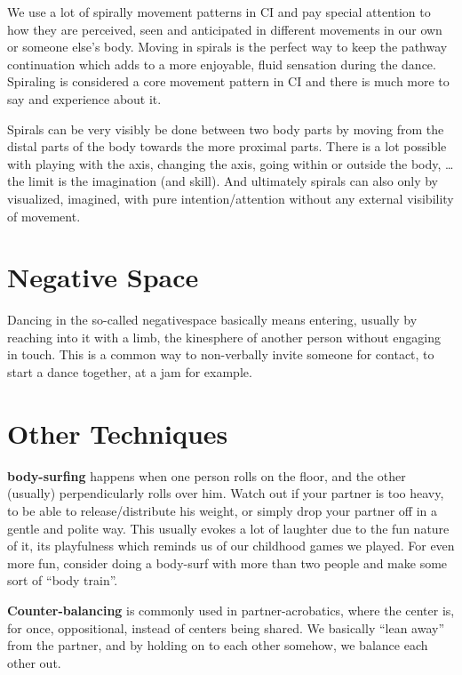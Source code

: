 We use a lot of spirally movement patterns in CI and pay special attention to how they are perceived, seen and anticipated in different movements in our own or someone else's body.
Moving in spirals is the perfect way to keep the pathway continuation which adds to a more enjoyable, fluid sensation during the dance.
Spiraling is considered a core movement pattern in CI and there is much more to say and experience about it.

Spirals can be very visibly be done between two body parts by moving from the distal parts of the body towards the more proximal parts.
There is a lot possible with playing with the axis, changing the axis, going within or outside the body, \ldots the limit is the imagination (and skill).
And ultimately spirals can also only by visualized, imagined, with pure intention/attention without any external visibility of movement.

\section{Negative Space}\label{sec:negative-space}

Dancing in the so-called \gls{negativespace} basically means entering, usually by reaching into it with a limb, the \gls{kinesphere} of another person without engaging in touch.
This is a common way to non-verbally invite someone for contact, to start a dance together, at a jam for example.

\section{Other Techniques}\label{sec:other-techniques}

\textbf{\Gls{body-surfing}} happens when one person rolls on the floor, and the other (usually) perpendicularly rolls over him.
Watch out if your partner is too heavy, to be able to release/distribute his weight, or simply drop your partner off in a gentle and polite way.
This usually evokes a lot of laughter due to the fun nature of it, its playfulness which reminds us of our childhood games we played.
For even more fun, consider doing a body-surf with more than two people and make some sort of ``body train''.

\textbf{Counter-balancing} is commonly used in partner-acrobatics, where the center is, for once, oppositional, instead of centers being shared.
We basically ``lean away'' from the partner, and by holding on to each other somehow, we balance each other out.


